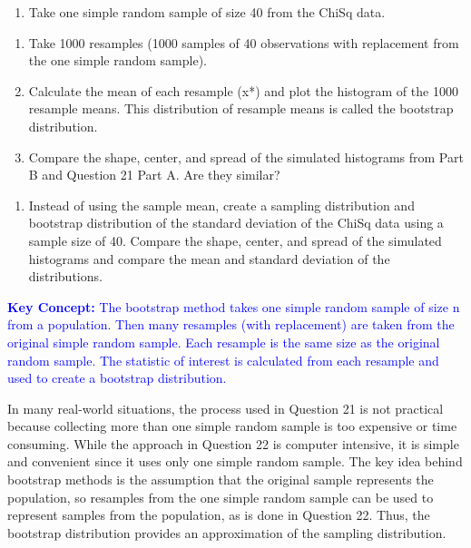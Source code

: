 \documentclass[
]{report}
\providecommand{\tightlist}{%
  \setlength{\itemsep}{0pt}\setlength{\parskip}{0pt}}
\begin{document}
\begin{enumerate}
\def\labelenumi{\arabic{enumi}.}
\setcounter{enumi}{21}
\tightlist
\item
  Take one simple random sample of size 40 from the ChiSq data.
\end{enumerate}

\begin{enumerate}
\def\labelenumi{\alph{enumi}.}
\item
  Take 1000 resamples (1000 samples of 40 observations with replacement from the one simple random sample).
\item
  Calculate the mean of each resample (x*) and plot the histogram of the 1000 resample means. This distribution of resample means is called the bootstrap distribution.
\item
  Compare the shape, center, and spread of the simulated histograms from Part B and Question 21 Part A. Are they similar?
\end{enumerate}

\begin{enumerate}
\def\labelenumi{\arabic{enumi}.}
\setcounter{enumi}{22}
\tightlist
\item
  Instead of using the sample mean, create a sampling distribution and bootstrap distribution of the standard deviation of the ChiSq data using a sample size of 40. Compare the shape, center, and spread of the simulated histograms and compare the mean and standard deviation of the distributions.
\end{enumerate}

\textbf{\textcolor{blue}{Key Concept:}}
\textcolor{blue}{The bootstrap method takes one simple random sample of size n from a population. Then many resamples (with replacement) are taken from the original simple random sample. Each resample is the same size as the original random sample. The statistic of interest is calculated from each resample and used to create a bootstrap distribution.}

In many real-world situations, the process used in Question 21 is not practical because collecting more than one simple random sample is too expensive or time consuming. While the approach in Question 22 is computer intensive, it is simple and convenient since it uses only one simple random sample. The key idea behind bootstrap methods is the assumption that the original sample represents the population, so resamples from the one simple random sample can be used to represent samples from the population, as is done in Question 22. Thus, the bootstrap distribution provides an approximation of the sampling distribution.
\end{document}
